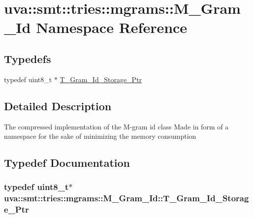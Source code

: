 \hypertarget{namespaceuva_1_1smt_1_1tries_1_1mgrams_1_1_m___gram___id}{}\section{uva\+:\+:smt\+:\+:tries\+:\+:mgrams\+:\+:M\+\_\+\+Gram\+\_\+\+Id Namespace Reference}
\label{namespaceuva_1_1smt_1_1tries_1_1mgrams_1_1_m___gram___id}
\subsection*{Typedefs}
\begin{DoxyCompactItemize}
\item 
typedef uint8\+\_\+t $\ast$ \hyperlink{namespaceuva_1_1smt_1_1tries_1_1mgrams_1_1_m___gram___id_a478e6468dbd5dab37599c566d77c845c}{T\+\_\+\+Gram\+\_\+\+Id\+\_\+\+Storage\+\_\+\+Ptr}
\end{DoxyCompactItemize}


\subsection{Detailed Description}
The compressed implementation of the M-\/gram id class Made in form of a namespace for the sake of minimizing the memory consumption 

\subsection{Typedef Documentation}
\hypertarget{namespaceuva_1_1smt_1_1tries_1_1mgrams_1_1_m___gram___id_a478e6468dbd5dab37599c566d77c845c}{}
\subsubsection[{T\+\_\+\+Gram\+\_\+\+Id\+\_\+\+Storage\+\_\+\+Ptr}]{\setlength{\rightskip}{0pt plus 5cm}typedef uint8\+\_\+t$\ast$ {\bf uva\+::smt\+::tries\+::mgrams\+::\+M\+\_\+\+Gram\+\_\+\+Id\+::\+T\+\_\+\+Gram\+\_\+\+Id\+\_\+\+Storage\+\_\+\+Ptr}}\label{namespaceuva_1_1smt_1_1tries_1_1mgrams_1_1_m___gram___id_a478e6468dbd5dab37599c566d77c845c}
